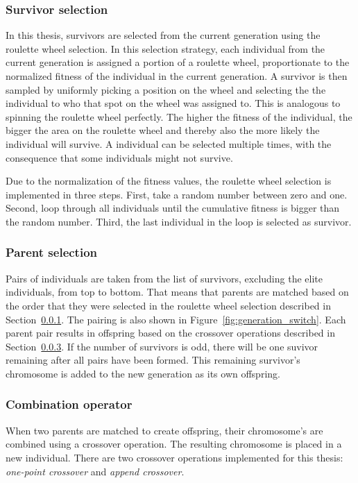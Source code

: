 \subsubsection{Survivor selection}
\label{sec:approach_survivor_selection}
In this thesis, survivors are selected from the current generation using the
roulette wheel selection. In this selection strategy, each individual from the
current generation is assigned a portion of a roulette wheel, proportionate to
the normalized fitness of the individual in the current generation. A survivor
is then sampled by uniformly picking a position on the wheel and selecting the
the individual to who that spot on the wheel was assigned to. This is analogous
to spinning the roulette wheel perfectly. The higher the fitness of the
individual, the bigger the area on the roulette wheel and thereby also the more
likely the individual will survive. A individual can be selected multiple
times, with the consequence that some individuals might not survive.

Due to the normalization of the fitness values, the roulette wheel selection
is implemented in three steps. First, take a random number between zero and one.
Second, loop through all individuals until the cumulative fitness is bigger
than the random number. Third, the last individual in the loop is selected as
survivor.

\subsubsection{Parent selection}
\label{sec:approach_parent_selection}
Pairs of individuals are taken from the list of survivors, excluding the elite
individuals, from top to bottom. That means that parents are matched based on
the order that they were selected in the roulette wheel selection described in
Section~\ref{sec:approach_survivor_selection}. The pairing is also shown in
Figure~\ref{fig:generation_switch}. Each parent pair results in offspring
based on the crossover operations described in
Section~\ref{sec:approach_combination_operator}. If the number of survivors is
odd, there will be one suvivor remaining after all pairs have been formed.
This remaining survivor's chromosome is added to the new generation
as its own offspring.

\subsubsection{Combination operator}
\label{sec:approach_combination_operator}
When two parents are matched to create offspring, their chromosome's are
combined using a crossover operation. The resulting chromosome is placed in a
new individual. There are two crossover operations implemented for this thesis:
\emph{one-point crossover} and \emph{append crossover}.

